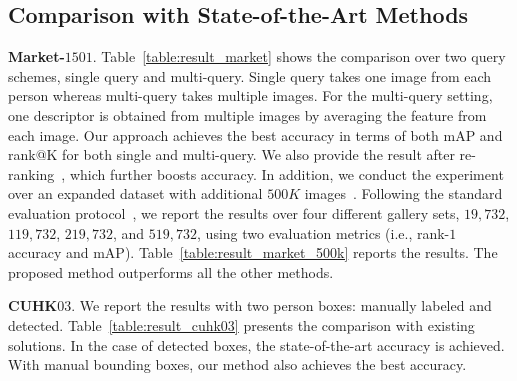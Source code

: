 \documentclass{llncs}
\begin{document}
\subsection{Comparison with State-of-the-Art Methods}

\noindent\textbf{Market-$1501$}.
Table~\ref{table:result_market} shows the comparison over two query schemes, single query and multi-query. Single query takes one image from each person whereas multi-query takes multiple images. For the multi-query setting, one descriptor is obtained from multiple images by averaging the feature from each image. Our approach achieves the best accuracy in terms of both mAP and rank@K for both single and multi-query.
We also provide the result after re-ranking~\cite{conf/cvpr/zhong17}, which further boosts accuracy.  In addition, we conduct the experiment over an expanded dataset with additional $500K$ images~\cite{conf/iccv/zheng15}. Following the standard evaluation protocol~\cite{journal/arxiv/hermans17}, we report the results over four different gallery sets, 
$19, 732$,
$119,732$,
$219,732$,
and $519,732$,
using two evaluation metrics (i.e., rank-$1$ accuracy and mAP). Table~\ref{table:result_market_500k} reports the results. The proposed method outperforms all the other methods.

\vspace{.1cm}
\noindent\textbf{CUHK$03$}.
We report the results
with two person boxes:
manually labeled
and detected.
Table~\ref{table:result_cuhk03} presents the comparison with existing solutions.
In the case of detected boxes, the state-of-the-art accuracy is achieved. With manual bounding boxes, our method also achieves the best accuracy.
\end{document}
